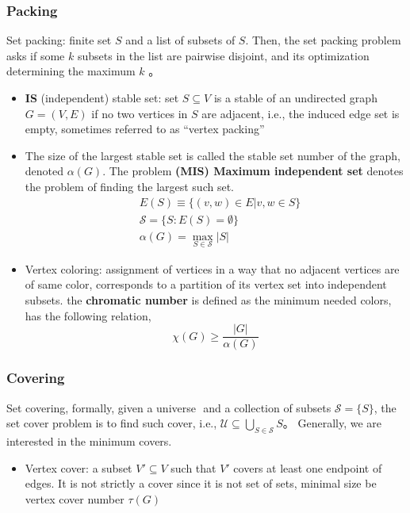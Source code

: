 \documentclass[../main]{subfiles}
\begin{document}
\subsubsection*{Packing}
Set packing: finite set \(S\) and a list of subsets of \(S\). Then, the set packing problem asks if some \(k\) subsets in the list are pairwise disjoint, and its optimization determining the maximum \(k\) 。
\begin{itemize}
      \item \textbf{IS} (independent) stable set: set \(S \subseteq V\) is a stable of an
            undirected graph \(G = (V, E)\) if no two vertices in \(S\) are
            adjacent, i.e., the induced edge set is empty, sometimes referred to as ``vertex packing''
      \item The size of the
            largest stable set is called the stable set number of the graph,
            denoted \(\alpha(G)\). The problem \textbf{(MIS) Maximum independent set} denotes the problem of finding the largest such set.
            \begin{equation}
                  \begin{aligned}
                         & E(S) \equiv \{(v, w) \in E | v, w \in S\} \\
                         & \mathscr S = \{S: E(S)= \emptyset\}       \\
                         & \alpha (G) = \max_{S\in \mathscr S} |S|
                  \end{aligned}
            \end{equation}

      \item Vertex coloring: assignment of vertices in a way that no adjacent vertices are of same color, corresponds to a partition of its vertex set into independent subsets. the \textbf{chromatic number} is defined as the minimum needed colors, has the following relation,
            \begin{equation}
                  \chi(G) \ge \frac{|G|}{\alpha(G)}
            \end{equation}
\end{itemize}

\subsubsection*{Covering}
Set covering, formally, given a universe \(\) and a collection of subsets \(\mathscr S = \{S\}\), the set cover problem is to find such cover, i.e., \(\mathscr U \subseteq \bigcup_{S\in\mathscr S} S \)。 Generally, we are interested in the minimum covers.
\begin{itemize}
      \item Vertex cover: a subset \(V' \subseteq V\) such that \(V'\) covers at least one endpoint of edges. It is not strictly a cover since it is not set of sets, minimal size be vertex cover number \(\tau(G)\)
\end{itemize}
\end{document}
